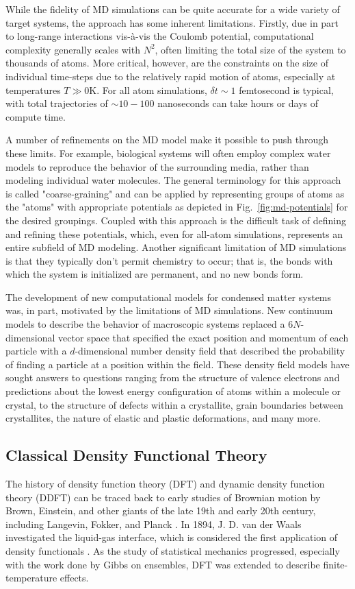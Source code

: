 While the fidelity of MD simulations can be quite accurate for a wide variety of target systems, the approach has some inherent limitations.  Firstly, due in part to long-range interactions vis-à-vis the Coulomb potential, computational complexity generally scales with $N^2$, often limiting the total size of the system to thousands of atoms.  More critical, however, are the constraints on the size of individual time-steps due to the relatively rapid motion of atoms, especially at temperatures $T \gg 0$K.  For all atom simulations, $\delta t \sim 1$ femtosecond is typical, with total trajectories of $\sim 10-100$ nanoseconds can take hours or days of compute time.

A number of refinements on the MD model make it possible to push through these limits.  For example, biological systems will often employ complex water models to reproduce the behavior of the surrounding media, rather than modeling individual water molecules.  The general terminology for this approach is called "coarse-graining" and can be applied by representing groups of atoms as the "atoms" with appropriate potentials as depicted in Fig.~\ref{fig:md-potentials} for the desired groupings.  Coupled with this approach is the difficult task of defining and refining these potentials, which, even for all-atom simulations, represents an entire subfield of MD modeling.  Another significant limitation of MD simulations is that they typically don't permit chemistry to occur; that is, the bonds with which the system is initialized are permanent, and no new bonds form.

The development of new computational models for condensed matter systems was, in part, motivated by the limitations of MD simulations.  New continuum models to describe the behavior of macroscopic systems replaced a $6N$-dimensional vector space that specified the exact position and momentum of each particle with a $d$-dimensional number density field that described the probability of finding a particle at a position within the field.  These density field models have sought answers to questions ranging from the structure of valence electrons and predictions about the lowest energy configuration of atoms within a molecule or crystal, to the structure of defects within a crystallite, grain boundaries between crystallites, the nature of elastic and plastic deformations, and many more.

\subsection{Classical Density Functional Theory}
The history of density function theory (DFT) and dynamic density function theory (DDFT) can be traced back to early studies of Brownian motion by Brown, Einstein, and other giants of the late 19th and early 20th century, including Langevin, Fokker, and Planck \cite{te2020classical}.  In 1894, J. D. van der Waals investigated the liquid-gas interface, which is considered the first application of density functionals \cite{te2020classical}.  As the study of statistical mechanics progressed, especially with the work done by Gibbs on ensembles, DFT was extended to describe finite-temperature effects.

